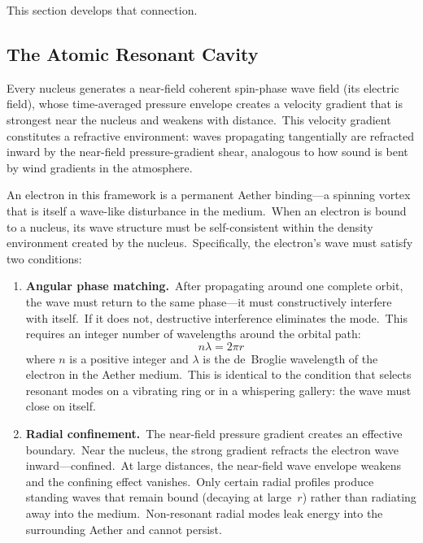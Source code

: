 ﻿\documentclass[12pt,letterpaper]{article}
\begin{document}
This section develops that connection.

\subsection{The Atomic Resonant Cavity}

Every nucleus generates a near-field coherent spin-phase wave field (its
electric field), whose time-averaged pressure envelope creates a velocity gradient
that is strongest near the nucleus and weakens with distance.\ This velocity gradient
constitutes a refractive environment: waves propagating tangentially are refracted
inward by the near-field pressure-gradient shear, analogous to how sound is bent by
wind gradients in the atmosphere.

An electron in this framework is a permanent Aether binding---a spinning vortex that is
itself a wave-like disturbance in the medium.\ When an electron is bound to a nucleus,
its wave structure must be self-consistent within the density environment created by the
nucleus.\ Specifically, the electron's wave must satisfy two conditions:

\begin{enumerate}[leftmargin=2em]
  \item \textbf{Angular phase matching.}\ After propagating around one complete orbit, the
    wave must return to the same phase---it must constructively interfere with itself.\
    If it does not, destructive interference eliminates the mode.\ This requires an integer
    number of wavelengths around the orbital path:
    \begin{equation}
      n\lambda = 2\pi r
    \end{equation}
    where $n$ is a positive integer and $\lambda$ is the de~Broglie wavelength of the
    electron in the Aether medium.\ This is identical to the condition that selects
    resonant modes on a vibrating ring or in a whispering gallery: the wave must
    close on itself.

  \item \textbf{Radial confinement.}\ The near-field pressure gradient creates an effective
    boundary.\ Near the nucleus, the strong gradient refracts the electron wave inward---confined.\
    At large distances, the near-field wave envelope weakens and the confining effect
    vanishes.\ Only certain radial profiles produce standing waves that remain bound
    (decaying at large~$r$) rather than radiating away into the medium.\ Non-resonant
    radial modes leak energy into the surrounding Aether and cannot persist.
\end{enumerate}
\end{document}
